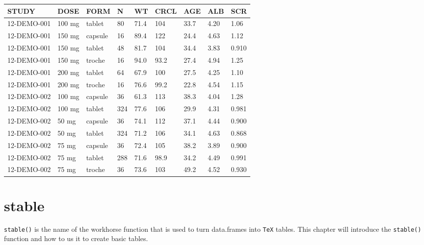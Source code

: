 \documentclass[
]{book}
\begin{document}
\begin{table}[H]
\centering
\setlength{\tabcolsep}{5pt} 
\begin{threeparttable}
\renewcommand{\arraystretch}{1.3}
\begin{tabular}[h]{lllllllll}
\hline
\textbf{STUDY} & \textbf{DOSE} & \textbf{FORM} & \textbf{N} & \textbf{WT} & \textbf{CRCL} & \textbf{AGE} & \textbf{ALB} & \textbf{SCR} \\
\hline
12-DEMO-001 & 100 mg & tablet & 80 & 71.4 & 104 & 33.7 & 4.20 & 1.06 \\
12-DEMO-001 & 150 mg & capsule & 16 & 89.4 & 122 & 24.4 & 4.63 & 1.12 \\
12-DEMO-001 & 150 mg & tablet & 48 & 81.7 & 104 & 34.4 & 3.83 & 0.910 \\
12-DEMO-001 & 150 mg & troche & 16 & 94.0 & 93.2 & 27.4 & 4.94 & 1.25 \\
12-DEMO-001 & 200 mg & tablet & 64 & 67.9 & 100 & 27.5 & 4.25 & 1.10 \\
12-DEMO-001 & 200 mg & troche & 16 & 76.6 & 99.2 & 22.8 & 4.54 & 1.15 \\
12-DEMO-002 & 100 mg & capsule & 36 & 61.3 & 113 & 38.3 & 4.04 & 1.28 \\
12-DEMO-002 & 100 mg & tablet & 324 & 77.6 & 106 & 29.9 & 4.31 & 0.981 \\
12-DEMO-002 & 50 mg & capsule & 36 & 74.1 & 112 & 37.1 & 4.44 & 0.900 \\
12-DEMO-002 & 50 mg & tablet & 324 & 71.2 & 106 & 34.1 & 4.63 & 0.868 \\
12-DEMO-002 & 75 mg & capsule & 36 & 72.4 & 105 & 38.2 & 3.89 & 0.900 \\
12-DEMO-002 & 75 mg & tablet & 288 & 71.6 & 98.9 & 34.2 & 4.49 & 0.991 \\
12-DEMO-002 & 75 mg & troche & 36 & 73.6 & 103 & 49.2 & 4.52 & 0.930 \\
\hline
\end{tabular}
\end{threeparttable}
\end{table}

\hypertarget{stable-intro}{%
\chapter{stable}\label{stable-intro}}

\texttt{stable()} is the name of the workhorse function that is used to turn
data.frames into \texttt{TeX} tables. This chapter will introduce the \texttt{stable()} function and how to us it to create basic tables.
\end{document}
